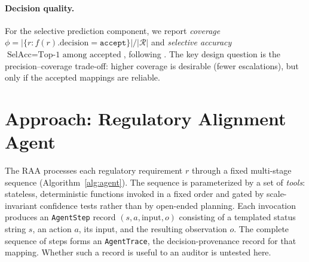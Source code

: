 \documentclass[a4paper,fleqn]{cas-sc}
\begin{document}
\paragraph{Decision quality.}
For the selective prediction component, we report \emph{coverage} $\phi = |\{r : f(r).\text{decision} = \texttt{accept}\}| / |\mathcal{R}|$ and \emph{selective accuracy} $\text{SelAcc} = \text{Top-1 among accepted}$, following \citet{Geifman2017}.
The key design question is the precision--coverage trade-off: higher coverage is desirable (fewer escalations), but only if the accepted mappings are reliable.


\section{Approach: Regulatory Alignment Agent}
\label{sec:architecture}


The RAA processes each regulatory requirement $r$ through a fixed multi-stage sequence (Algorithm~\ref{alg:agent}).
The sequence is parameterized by a set of \emph{tools}: stateless, deterministic functions invoked in a fixed order and gated by scale-invariant confidence tests rather than by open-ended planning.
Each invocation produces an \texttt{AgentStep} record $(s, a, \text{input}, o)$ consisting of a templated status string $s$, an action $a$, its input, and the resulting observation $o$.
The complete sequence of steps forms an \texttt{AgentTrace}, the decision-provenance record for that mapping. Whether such a record is useful to an auditor is untested here.
\end{document}
